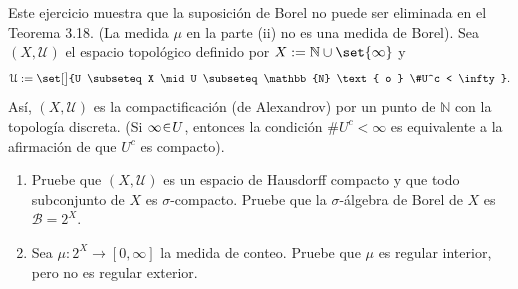 
\setcounter{neje}{23}
\begin{nejer}
Este ejercicio muestra que la suposición de Borel no puede ser eliminada en el Teorema 3.18. (La medida $\mu$ en la parte (ii) no es una medida de Borel). Sea $(X, \mathcal{U})$ el espacio topológico definido por $X := \mathbb{N} \cup \set{\infty}$ y
$$
\mathcal{U} := \set[\big]{U \subseteq X \mid U \subseteq \mathbb{N} \text{ o } \#U^c < \infty}.
$$
Así, $(X, \mathcal{U})$ es la compactificación (de Alexandrov) por un punto de $\mathbb{N}$ con la topología discreta. (Si $\infty \en U$, entonces la condición $\#U^c < \infty$ es equivalente a la afirmación de que $U^c$ es compacto).
\begin{enumerate}[label = (\roman*), leftmargin=1.5em]
    \item Pruebe que $(X, \mathcal{U})$ es un espacio de Hausdorff compacto y que todo subconjunto de $X$ es $\sigma$-compacto. Pruebe que la $\sigma$-álgebra de Borel de $X$ es $\mathcal{B} = 2^X$.
    \item Sea $\mu \colon 2^X \to [0, \infty]$ la medida de conteo. Pruebe que $\mu$ es regular interior, pero no es regular exterior.
\end{enumerate}
\end{nejer}
